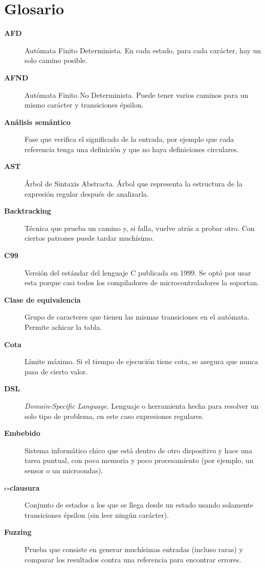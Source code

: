 \documentclass[runningheads]{llncs}
\begin{document}
\section*{Glosario}
\small
\begin{description}
  \item[\textbf{AFD}] Autómata Finito Determinista. En cada estado, para cada carácter, hay un solo camino posible.
  \item[\textbf{AFND}] Autómata Finito No Determinista. Puede tener varios caminos para un mismo carácter y transiciones épsilon.
  \item[\textbf{Análisis semántico}] Fase que verifica el significado de la entrada, por ejemplo que cada referencia tenga una definición y que no haya definiciones circulares.
  \item[\textbf{AST}] Árbol de Sintaxis Abstracta. Árbol que representa la estructura de la expresión regular después de analizarla.
  \item[\textbf{Backtracking}] Técnica que prueba un camino y, si falla, vuelve atrás a probar otro. Con ciertos patrones puede tardar muchísimo.
  \item[\textbf{C99}] Versión del estándar del lenguaje C publicada en 1999. Se optó por usar esta porque casi todos los compiladores de microcontroladores la soportan.
  \item[\textbf{Clase de equivalencia}] Grupo de caracteres que tienen las mismas transiciones en el autómata. Permite achicar la tabla.
  \item[\textbf{Cota}] Límite máximo. Si el tiempo de ejecución tiene cota, se asegura que nunca pasa de cierto valor.
  \item[\textbf{DSL}] \emph{Domain-Specific Language}. Lenguaje o herramienta hecha para resolver un solo tipo de problema, en este caso expresiones regulares.
  \item[\textbf{Embebido}] Sistema informático chico que está dentro de otro dispositivo y hace una tarea puntual, con poca memoria y poco procesamiento (por ejemplo, un sensor o un microondas).
  \item[\textbf{$\epsilon$-clausura}] Conjunto de estados a los que se llega desde un estado usando solamente transiciones épsilon (sin leer ningún carácter).
  \item[\textbf{Fuzzing}] Prueba que consiste en generar muchísimas entradas (incluso raras) y comparar los resultados contra una referencia para encontrar errores.

\end{description}
\end{document}
